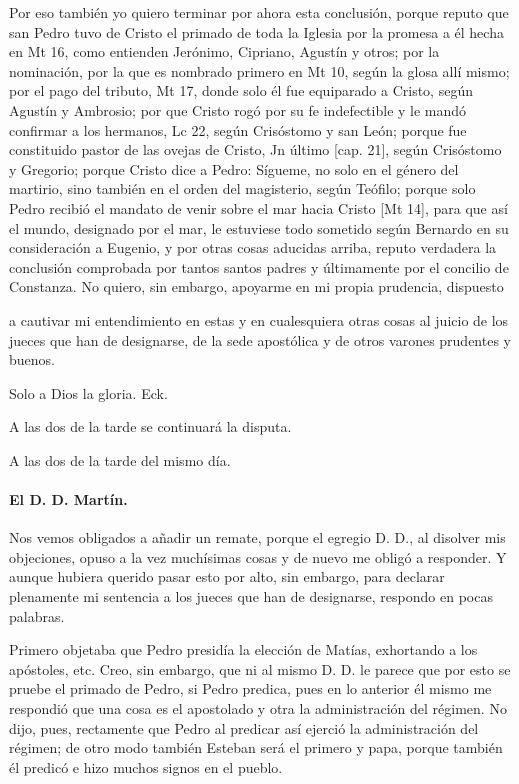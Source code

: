 Por eso también yo quiero terminar por ahora esta conclusión, porque reputo que san Pedro tuvo de Cristo el primado de toda la Iglesia por la promesa a él hecha en Mt 16, como entienden Jerónimo, Cipriano, Agustín y otros; por la nominación, por la que es nombrado primero en Mt 10, según la glosa allí mismo; por el pago del tributo, Mt 17, donde solo él fue equiparado a Cristo, según Agustín y Ambrosio; por que Cristo rogó por su fe indefectible y le mandó confirmar a los hermanos, Lc 22, según Crisóstomo y san León; porque fue constituido pastor de las ovejas de Cristo, Jn último [cap. 21], según Crisóstomo y Gregorio; porque Cristo dice a Pedro: Sígueme, no solo en el género del martirio, sino también en el orden del magisterio, según Teófilo; porque solo Pedro recibió el mandato de venir sobre el mar hacia Cristo [Mt 14], para que así el mundo, designado por el mar, le estuviese todo sometido según Bernardo en su consideración a Eugenio, y por otras cosas aducidas arriba, reputo verdadera la conclusión comprobada por tantos santos padres y últimamente por el concilio de Constanza. No quiero, sin embargo, apoyarme en mi propia prudencia, dispuesto

a cautivar mi entendimiento en estas y en cualesquiera otras cosas al juicio de los jueces que han de designarse, de la sede apostólica y de otros varones prudentes y buenos.

Solo a Dios la gloria. Eck.

A las dos de la tarde se continuará la disputa.

\marginpar{\small[319]} A las dos de la tarde del mismo día.

\paragraph*{El D. D. Martín.}

Nos vemos obligados a añadir un remate, porque el egregio D. D., al disolver mis objeciones, opuso a la vez muchísimas cosas y de nuevo me obligó a responder. Y aunque hubiera querido pasar esto por alto, sin embargo, para declarar plenamente mi sentencia a los jueces que han de designarse, respondo en pocas palabras.

Primero objetaba que Pedro presidía la elección de Matías, exhortando a los apóstoles, etc. Creo, sin embargo, que ni al mismo D. D. le parece que por esto se pruebe el primado de Pedro, si Pedro predica, pues en lo anterior él mismo me respondió que una cosa es el apostolado y otra la administración del régimen. No dijo, pues, rectamente que Pedro al predicar así ejerció la administración del régimen; de otro modo también Esteban será el primero y papa, porque también él predicó e hizo muchos signos en el pueblo.


